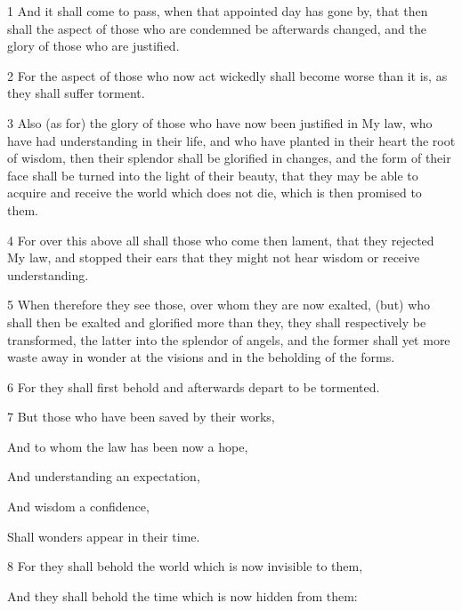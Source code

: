 \par 1 And it shall come to pass, when that appointed day has gone by, that then shall the aspect of those who are condemned be afterwards changed, and the glory of those who are justified. 

\par 2 For the aspect of those who now act wickedly shall become worse than it is, as they shall suffer torment. 

\par 3 Also (as for) the glory of those who have now been justified in My law, who have had understanding in their life, and who have planted in their heart the root of wisdom, then their splendor shall be glorified in changes, and the form of their face shall be turned into the light of their beauty, that they may be able to acquire and receive the world which does not die, which is then promised to them. 

\par 4 For over this above all shall those who come then lament, that they rejected My law, and stopped their ears that they might not hear wisdom or receive understanding. 

\par 5 When therefore they see those, over whom they are now exalted, (but) who shall then be exalted and glorified more than they, they shall respectively be transformed, the latter into the splendor of angels, and the former shall yet more waste away in wonder at the visions and in the beholding of the forms. 

\par 6 For they shall first behold and afterwards depart to be tormented.

\par 7 But those who have been saved by their works,

\par And to whom the law has been now a hope,

\par And understanding an expectation,

\par And wisdom a confidence,

\par Shall wonders appear in their time.

\par 8 For they shall behold the world which is now invisible to them, 

\par And they shall behold the time which is now hidden from them:

